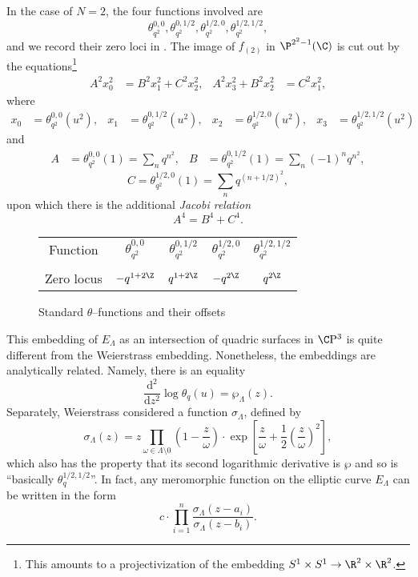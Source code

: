 \begin{example}
In the case of \(N = 2\), the four functions involved are \[\theta_{q^2}^{0,0}, \theta_{q^2}^{0,1/2}, \theta_{q^2}^{1/2,0}, \theta_{q^2}^{1/2,1/2},\] and we record their zero loci in .  The image of \(f_{(2)}\) in \(\P^{2^2 - 1}(\C)\) is cut out by the equations\footnote{This amounts to a projectivization of the embedding \(S^1 \times S^1 \to \R^2 \times \R^2\).}
\begin{align*}
A^2 x_0^2 & = B^2 x_1^2 + C^2 x_2^2, &
A^2 x_3^2 + B^2 x_2^2 & = C^2 x_1^2,
\end{align*}
where
\begin{align*}
x_0 & = \theta_{q^2}^{0, 0}(u^2), &
x_1 & = \theta_{q^2}^{0, 1/2}(u^2), &
x_2 & = \theta_{q^2}^{1/2, 0}(u^2), &
x_3 & = \theta_{q^2}^{1/2, 1/2}(u^2)
\end{align*}
and
\begin{align*}
A & = \theta_{q^2}^{0, 0}(1) = \sum_n q^{n^2}, &
B & = \theta_{q^2}^{0, 1/2}(1) = \sum_n (-1)^n q^{n^2},
\end{align*}
\[C = \theta_{q^2}^{1/2, 0}(1) = \sum_n q^{(n + 1/2)^2},\]
upon which there is the additional \textit{Jacobi relation} \[A^4 = B^4 + C^4.\]
\end{example}

\begin{figure}
\begin{center}
\begin{tabular}{@{}ccccc@{}} \toprule
Function & \(\theta_{q^2}^{0,0}\) & \(\theta_{q^2}^{0,1/2}\) & \(\theta_{q^2}^{1/2,0}\) & \(\theta_{q^2}^{1/2,1/2}\) \\ \\
Zero locus & \(-q^{1+2\Z}\) & \(q^{1+2\Z}\) & \(-q^{2\Z}\) & \(q^{2\Z}\) \\
\bottomrule
\end{tabular}
\end{center}
\caption{Standard \(\theta\)--functions and their offsets}\label{ThetaFunctionsTable}
\end{figure}

\begin{remark}\label{EllipticFunctionsHaveWeierstrassPresentation}
This embedding of \(E_\Lambda\) as an intersection of quadric surfaces in \(\CP^3\) is quite different from the Weierstrass embedding.  Nonetheless, the embeddings are analytically related.  Namely, there is an equality \[\frac{\mathrm d^2}{\mathrm dz^2} \log \theta_q(u) = \wp_\Lambda(z).\]  Separately, Weierstrass considered a function \(\sigma_\Lambda\), defined by \[\sigma_\Lambda(z) = z \prod_{\omega \in \Lambda \setminus 0} \left( 1 - \frac{z}{\omega} \right) \cdot \exp \left[ \frac{z}{\omega} + \frac{1}{2} \left( \frac{z}{\omega} \right)^2 \right],\] which also has the property that its second logarithmic derivative is \(\wp\) and so is ``basically \(\theta_q^{1/2,1/2}\)''.  In fact, any meromorphic function on the elliptic curve $E_\Lambda$ can be written in the form \[c \cdot \prod_{i=1}^n \frac{\sigma_\Lambda(z - a_i)}{\sigma_\Lambda(z - b_i)}.\]
\end{remark}

